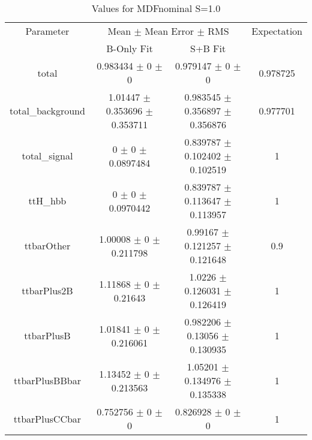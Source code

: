 \begin{table}
\centering
\caption{Values for MDFnominal S=1.0}
\begin{tabular}{cccc}
\toprule
Parameter & \multicolumn{2}{c}{Mean $\pm$ Mean Error $\pm$ RMS} & Expectation\\
 & B-Only Fit & S+B Fit & \\
\midrule
total & \num{0.983434} $\pm$ \num{0} $\pm$ \num{0} & \num{0.979147} $\pm$ \num{0} $\pm$ \num{0} & \num{0.978725}\\
total\_background & \num{1.01447} $\pm$ \num{0.353696} $\pm$ \num{0.353711} & \num{0.983545} $\pm$ \num{0.356897} $\pm$ \num{0.356876} & \num{0.977701}\\
total\_signal & \num{0} $\pm$ \num{0} $\pm$ \num{0.0897484} & \num{0.839787} $\pm$ \num{0.102402} $\pm$ \num{0.102519} & \num{1}\\
ttH\_hbb & \num{0} $\pm$ \num{0} $\pm$ \num{0.0970442} & \num{0.839787} $\pm$ \num{0.113647} $\pm$ \num{0.113957} & \num{1}\\
ttbarOther & \num{1.00008} $\pm$ \num{0} $\pm$ \num{0.211798} & \num{0.99167} $\pm$ \num{0.121257} $\pm$ \num{0.121648} & \num{0.9}\\
ttbarPlus2B & \num{1.11868} $\pm$ \num{0} $\pm$ \num{0.21643} & \num{1.0226} $\pm$ \num{0.126031} $\pm$ \num{0.126419} & \num{1}\\
ttbarPlusB & \num{1.01841} $\pm$ \num{0} $\pm$ \num{0.216061} & \num{0.982206} $\pm$ \num{0.13056} $\pm$ \num{0.130935} & \num{1}\\
ttbarPlusBBbar & \num{1.13452} $\pm$ \num{0} $\pm$ \num{0.213563} & \num{1.05201} $\pm$ \num{0.134976} $\pm$ \num{0.135338} & \num{1}\\
ttbarPlusCCbar & \num{0.752756} $\pm$ \num{0} $\pm$ \num{0} & \num{0.826928} $\pm$ \num{0} $\pm$ \num{0} & \num{1}\\
\bottomrule
\end{tabular}
\end{table}